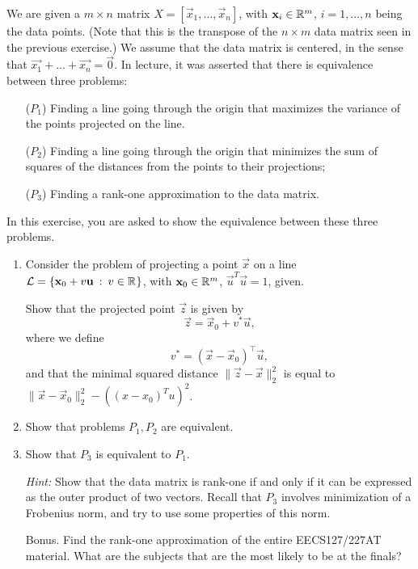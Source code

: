 
We are given a $m \times n$ matrix $X = [\vec{x}_1,\ldots,\vec{x}_n]$, with $\mathbf{x}_i \in \mathbb{R}^{m}$, $i=1,\ldots,n$ being the data points. (Note that this is the transpose of the $n\times m$ data matrix seen in the previous exercise.) We assume that the data matrix is centered, in the sense that $\vec{x_1}+\ldots+\vec{x_n} = \vec{0}$. In lecture, it was asserted that there is equivalence between three problems:
\begin{itemize}
	\item[($P_1$)] Finding a line going through the origin that maximizes the variance of the points projected on the line.
	\item[($P_2$)] Finding a line going through the origin that minimizes the sum of squares of the distances from the points to their projections;
	\item[($P_3$)] Finding a rank-one approximation to the data matrix.
\end{itemize}
In this exercise, you are asked to show the equivalence between these three problems. 

\begin{enumerate}
\item Consider the problem of projecting a point $\vec{x}$ on a line ${\cal L} = \{\mathbf{x}_0 + v \mathbf{u} \::\: v \in \mathbb{R}^{}\}$,
with $\mathbf{x}_0 \in \mathbb{R}^{m}$,
$\vec{u}^T\vec{u}=1$, given. 

Show that the projected point $\vec{z}$ is given by 
$$\vec{z} = \vec{x}_0+v^* \vec{u},$$
where we define 
$$v^* = (\vec{x}-\vec{x}_0)^\top\vec{u},$$
and that the minimal squared distance $\|\vec{z}-\vec{x}\|_2^2$ is equal to $\|\vec{x}-\vec{x}_0\|_2^2 - ((x-x_0)^Tu)^2$.

\sol{}
\item Show that problems $P_1,P_2$ are equivalent.

\sol{}
\item Show that $P_3$ is equivalent to $P_1$. 

\emph{Hint: } Show that the data matrix is rank-one if and only if it can be expressed as the outer product of two vectors. Recall that $P_3$ involves minimization of a Frobenius norm, and try to use some properties of this norm.

\sol{}
\item[Bonus.] Find the rank-one approximation of the entire EECS127/227AT material. What are the subjects that are the most likely to be at the finals?

\sol{}
\end{enumerate}